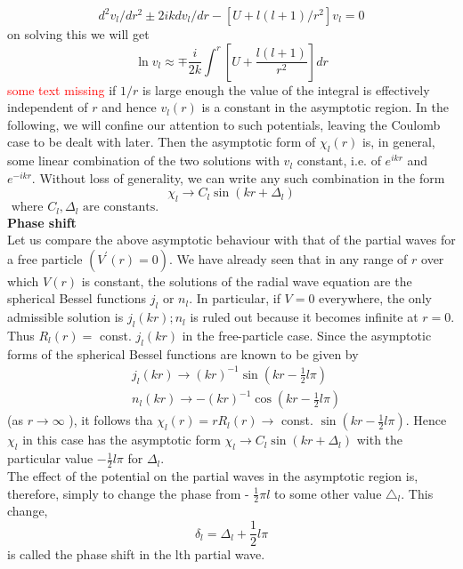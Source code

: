 $$
d^{2} v_{l} / d r^{2} \pm 2 i k d v_{l} / d r-\left[U+l(l+1) / r^{2}\right] v_{l}=0
$$
on solving this we will get\\
$$\ln v_{l} \approx \mp \frac{i}{2 k} \int^{r}\left[U+\frac{l(l+1)}{r^{2}}\right] d r$$
\textcolor{red}{some text missing} if $1/r$ is large enough the value of the integral is effectively independent of $r$ and hence $v_{l}(r)$ is a constant in the asymptotic region. In the following, we will confine our attention to such potentials, leaving the Coulomb case to be dealt with later. Then the asymptotic form of $\chi_{l}(r)$ is, in general, some linear combination of the two solutions with $v_{l}$ constant, i.e. of $e^{i k r}$ and $e^{-ikr}$. Without loss of generality, we can write any such combination in the form\\
$${\chi}_{l} \rightarrow C_{l} \sin \left(k r+\Delta_{l}\right)$$
$\text { where } C_{l}, \Delta_{l} \text { are constants. }$\\
\textbf{Phase shift}\\
 Let us compare the above asymptotic behaviour with that of the partial waves for a free particle $\left(V^{\prime}(r)=0\right)$. We have already seen  that in any range of $r$ over which $V(r)$ is constant, the solutions of the radial wave equation are the spherical Bessel functions $j_{l}$ or $n_{l}$. In particular, if $V=0$ everywhere, the only admissible solution is $j_{l}(k r) ; n_{l}$ is ruled out because it becomes infinite at $r=0$. Thus $R_{l}(r)=$ const. $j_{l}(k r)$ in the free-particle case. Since the asymptotic forms of the spherical Bessel functions are known to be given by
 $$\begin{aligned}
 	&j_{l}(k r) \rightarrow(k r)^{-1} \sin \left(k r-\frac{1}{2} l \pi\right) \\
 	&n_{l}(k r) \rightarrow-(k r)^{-1} \cos \left(k r-\frac{1}{2} l \pi\right)
 \end{aligned}$$
 (as $r \rightarrow \infty$ ), it follows tha $\chi_{l}(r)=r R_{l}(r) \rightarrow$ const. $\sin \left(k r-\frac{1}{2} l \pi\right)$. Hence $\chi_{l}$ in this case has the asymptotic form ${\chi}_{l} \rightarrow C_{l} \sin \left(k r+\Delta_{l}\right)$ with the particular value $-\frac{1}{2} l \pi$ for $\Delta_{l}$.\\
 The effect of the potential on the partial waves in the asymptotic region is, therefore, simply to change the phase from - $\frac{1}{2} \pi l$ to some other value $\triangle_{l}$. This change,
 $$
 \delta_{l}=\Delta_{l}+\frac{1}{2} l \pi
 $$
 is called the phase shift in the lth partial wave.
